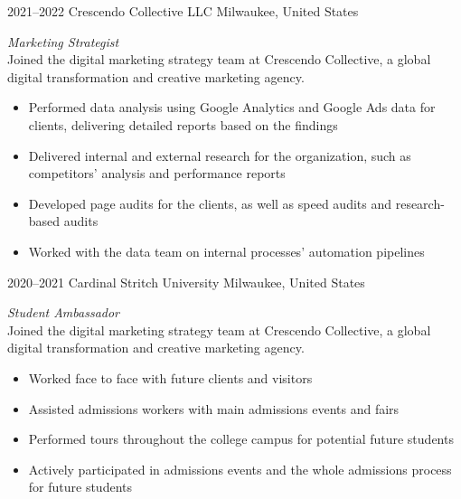 \documentclass[]{friggeri-cv-a4}
\begin{document}

\begin{entrylist}


\entry
{2021--2022}
{Crescendo Collective LLC}
{Milwaukee, United States}
{\emph{Marketing Strategist} \\
Joined the digital marketing strategy team at Crescendo Collective, a global digital transformation and creative marketing agency.\\
\begin{itemize}
\item Performed data analysis using Google Analytics and Google Ads data for clients, delivering detailed reports based on the findings
\item Delivered internal and external research for the organization, such as competitors’ analysis and performance reports
\item Developed page audits for the clients, as well as speed audits and research-based audits
\item Worked with the data team on internal processes' automation pipelines
\end{itemize}}


\entry
{2020--2021}
{Cardinal Stritch University}
{Milwaukee, United States}
{\emph{Student Ambassador} \\
Joined the digital marketing strategy team at Crescendo Collective, a global digital transformation and creative marketing agency.\\
\begin{itemize}
\item Worked face to face with future clients and visitors
\item Assisted admissions workers with main admissions events and fairs
\item Performed tours throughout the college campus for potential future students
\item Actively participated in admissions events and the whole admissions process for future students
\end{itemize}}


\end{entrylist}
\end{document}
